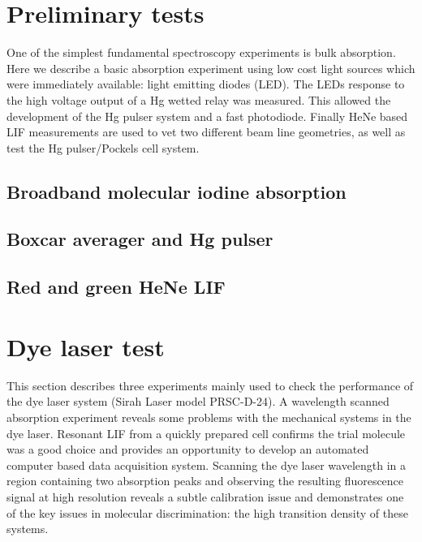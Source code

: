 
\section{Preliminary tests}
One of the simplest fundamental spectroscopy experiments is bulk absorption. Here we describe a basic absorption experiment using low cost light sources which were immediately available: light emitting diodes (LED). The LEDs response to the high voltage output of a Hg wetted relay was measured. This allowed the development of the Hg pulser system and a fast photodiode. Finally HeNe based LIF measurements are used to vet two different beam line geometries, as well as test the Hg pulser/Pockels cell system.
\subsection{Broadband molecular iodine absorption}

\subsection{Boxcar averager and Hg pulser}

\subsection{Red and green HeNe LIF}

\section{Dye laser test}
This section describes three experiments mainly used to check the performance of the dye laser system (Sirah Laser model PRSC-D-24). A wavelength scanned absorption experiment reveals some problems with the mechanical systems in the dye laser. Resonant LIF from a quickly prepared cell confirms the trial molecule was a good choice and provides an opportunity to develop an automated computer based data acquisition system. Scanning the dye laser wavelength in a region containing two absorption peaks and observing the resulting fluorescence signal at high resolution reveals a subtle calibration issue and demonstrates one of the key issues in molecular discrimination: the high transition density of these systems.
